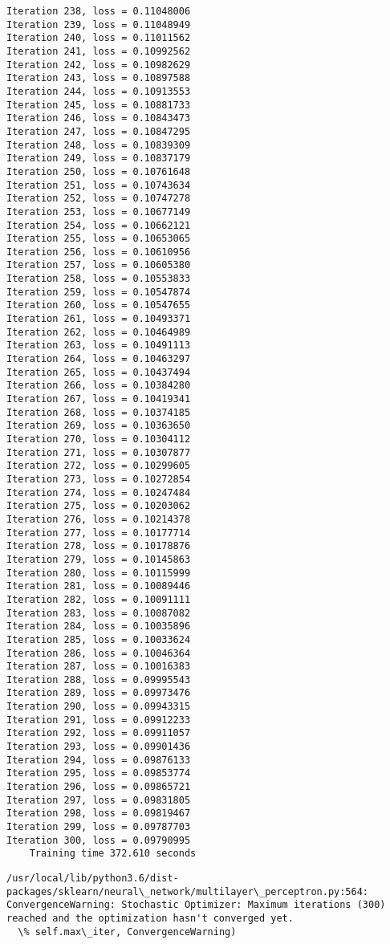 \documentclass[11pt]{article}
\begin{document}
\begin{Verbatim}[commandchars=\\\{\}]
Iteration 238, loss = 0.11048006
Iteration 239, loss = 0.11048949
Iteration 240, loss = 0.11011562
Iteration 241, loss = 0.10992562
Iteration 242, loss = 0.10982629
Iteration 243, loss = 0.10897588
Iteration 244, loss = 0.10913553
Iteration 245, loss = 0.10881733
Iteration 246, loss = 0.10843473
Iteration 247, loss = 0.10847295
Iteration 248, loss = 0.10839309
Iteration 249, loss = 0.10837179
Iteration 250, loss = 0.10761648
Iteration 251, loss = 0.10743634
Iteration 252, loss = 0.10747278
Iteration 253, loss = 0.10677149
Iteration 254, loss = 0.10662121
Iteration 255, loss = 0.10653065
Iteration 256, loss = 0.10610956
Iteration 257, loss = 0.10605380
Iteration 258, loss = 0.10553833
Iteration 259, loss = 0.10547874
Iteration 260, loss = 0.10547655
Iteration 261, loss = 0.10493371
Iteration 262, loss = 0.10464989
Iteration 263, loss = 0.10491113
Iteration 264, loss = 0.10463297
Iteration 265, loss = 0.10437494
Iteration 266, loss = 0.10384280
Iteration 267, loss = 0.10419341
Iteration 268, loss = 0.10374185
Iteration 269, loss = 0.10363650
Iteration 270, loss = 0.10304112
Iteration 271, loss = 0.10307877
Iteration 272, loss = 0.10299605
Iteration 273, loss = 0.10272854
Iteration 274, loss = 0.10247484
Iteration 275, loss = 0.10203062
Iteration 276, loss = 0.10214378
Iteration 277, loss = 0.10177714
Iteration 278, loss = 0.10178876
Iteration 279, loss = 0.10145863
Iteration 280, loss = 0.10115999
Iteration 281, loss = 0.10089446
Iteration 282, loss = 0.10091111
Iteration 283, loss = 0.10087082
Iteration 284, loss = 0.10035896
Iteration 285, loss = 0.10033624
Iteration 286, loss = 0.10046364
Iteration 287, loss = 0.10016383
Iteration 288, loss = 0.09995543
Iteration 289, loss = 0.09973476
Iteration 290, loss = 0.09943315
Iteration 291, loss = 0.09912233
Iteration 292, loss = 0.09911057
Iteration 293, loss = 0.09901436
Iteration 294, loss = 0.09876133
Iteration 295, loss = 0.09853774
Iteration 296, loss = 0.09865721
Iteration 297, loss = 0.09831805
Iteration 298, loss = 0.09819467
Iteration 299, loss = 0.09787703
Iteration 300, loss = 0.09790995
    Training time 372.610 seconds

    \end{Verbatim}

    \begin{Verbatim}[commandchars=\\\{\}]
/usr/local/lib/python3.6/dist-packages/sklearn/neural\_network/multilayer\_perceptron.py:564: ConvergenceWarning: Stochastic Optimizer: Maximum iterations (300) reached and the optimization hasn't converged yet.
  \% self.max\_iter, ConvergenceWarning)

    \end{Verbatim}
\end{document}
